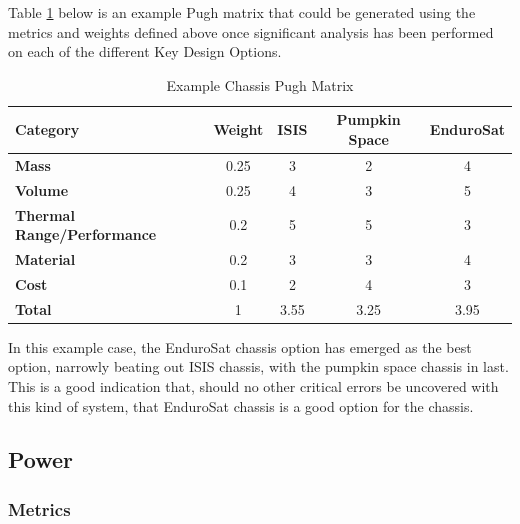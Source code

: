 \documentclass{ece}
\begin{document}
Table \ref{tbl:chassis_Pugh} below is an example Pugh matrix that could be generated using the metrics and weights defined above once significant analysis has been performed on each of the different Key Design Options. 
\begin{table}[H]
\centering
\begin{tabular}{|l|c|c|c|c|} 
\hline
    \textbf{Category} & \textbf{Weight} & \textbf{ISIS} & \textbf{Pumpkin Space} & \textbf{EnduroSat}
    \\
\hline
    \textbf{Mass} & 0.25 & 3 & 2 & 4
    \\
\hline
    \textbf{Volume} & 0.25 & 4 & 3 & 5
    \\
\hline
    \textbf{Thermal Range/Performance} & 0.2 & 5 & 5 & 3
    \\
\hline
    \textbf{Material} & 0.2 & 3 & 3 & 4
    \\
\hline
    \textbf{Cost} & 0.1 & 2 & 4 & 3
    \\
\hline
    \textbf{Total} & 1 & 3.55 & 3.25 & 3.95
    \\
\hline
\end{tabular}
\caption{Example Chassis Pugh Matrix }
\label{tbl:chassis_Pugh}
\end{table}

In this example case, the EnduroSat chassis option has emerged as the best option, narrowly beating out ISIS chassis, with the pumpkin space chassis in last. This is a good indication that, should no other critical errors be uncovered with this kind of system, that EnduroSat chassis is a good option for the chassis.

\subsection{Power}
\subsubsection{Metrics}
\end{document}
